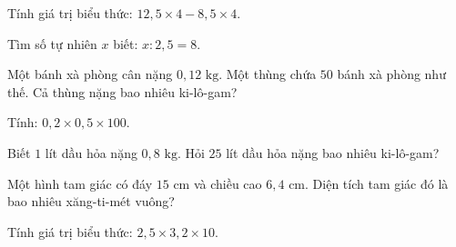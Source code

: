 \begin{ex}
  Tính giá trị biểu thức: $12{,}5 \times 4 - 8{,}5 \times 4$.
\end{ex}

\begin{ex}
  Tìm số tự nhiên $x$ biết: $x : 2{,}5 = 8$.
\end{ex}

\begin{ex}
  Một bánh xà phòng cân nặng $0{,}12\text{ kg}$. Một thùng chứa $50$ bánh xà phòng như thế. Cả thùng nặng bao nhiêu ki-lô-gam?
\end{ex}

\begin{ex}
  Tính: $0{,}2 \times 0{,}5 \times 100$.
\end{ex}

\begin{ex}
  Biết $1$ lít dầu hỏa nặng $0{,}8\text{ kg}$. Hỏi $25$ lít dầu hỏa nặng bao nhiêu ki-lô-gam?
\end{ex}

\begin{ex}
  Một hình tam giác có đáy $15\text{ cm}$ và chiều cao $6{,}4\text{ cm}$. Diện tích tam giác đó là bao nhiêu xăng-ti-mét vuông?
\end{ex}

\begin{ex}
  Tính giá trị biểu thức: $2{,}5 \times 3{,}2 \times 10$.
\end{ex}
